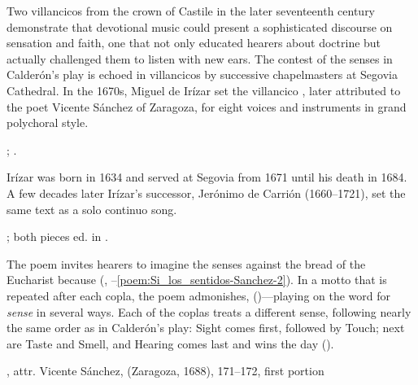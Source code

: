 Two villancicos from the crown of Castile in the later seventeenth century
demonstrate that devotional music could present a sophisticated discourse on
sensation and faith, one that not only educated hearers about doctrine but
actually challenged them to listen with new ears.  
The contest of the senses in Calderón's play is echoed in villancicos by
successive chapelmasters at Segovia Cathedral.
In the 1670s, Miguel de Irízar set the villancico , later attributed to the poet Vicente Sánchez of
Zaragoza, for eight voices and instruments in grand polychoral style.%
\begin{Footnote}
   ; \autocite{LopezCalo:Segovia}.
\end{Footnote}
Irízar was born in 1634 and served at Segovia from 1671 until his death in 1684.
A few decades later Irízar's successor, Jerónimo de Carrión (1660--1721), set
the same text as a solo continuo song.%
\begin{Footnote}
    ; both pieces ed. in \autocite[133--152]{Cashner:WLSCM32}.
\end{Footnote}


The poem invites hearers to imagine the senses 
against the bread of the Eucharist because  (,
--\ref{poem:Si_los_sentidos-Sanchez-2}).%
    \Autocite[171--172]{Sanchez:LiraPoetica}
In a motto that is repeated after each copla, the poem admonishes,  ()---playing
on the word for \emph{sense} in several ways.  
Each of the coplas treats a different sense, following nearly the same order as
in Calderón's play: Sight comes first, followed by Touch; next are Taste and
Smell, and Hearing comes last and wins the day ().


\begin{poemexample}
    \caption{, attr.
    Vicente Sánchez,  (Zaragoza, 1688), 171--172, first
    portion}
    \label{poem:Si_los_sentidos-Sanchez-1}
\end{poemexample}

